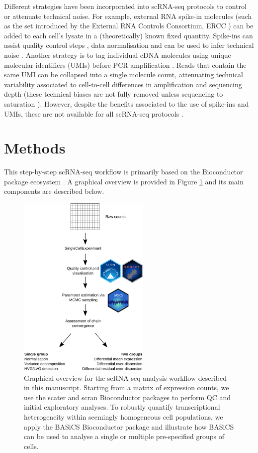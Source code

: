 \documentclass[9pt,a4paper,]{extarticle}
\begin{document}
Different strategies have been incorporated into scRNA-seq protocols to control
or attenuate technical noise.
For example, external RNA spike-in molecules (such as the set introduced by the
External RNA Controls Consortium, ERCC \citep{Rna2005}) can be added to each cell's
lysate in a (theoretically) known fixed quantity.
Spike-ins can assist quality control steps \citep{McCarthy2017}, data normalisation
\citep{Vallejos2017} and can be used to infer technical noise \citep{Brennecke2013}.
Another strategy is to tag individual cDNA molecules using unique molecular
identifiers (UMIs) before PCR amplification \citep{Islam2014}.
Reads that contain the same UMI can be collapsed into a single molecule count,
attenuating technical variability associated to cell-to-cell differences
in amplification and sequencing depth (these technical biases are not fully
removed unless sequencing to saturation \citep{Vallejos2017}).
However, despite the benefits associated to the use of spike-ins and UMIs,
these are not available for all scRNA-seq protocols \citep{Haque2017}.

\hypertarget{methods}{%
\section{Methods}\label{methods}}

This step-by-step scRNA-seq workflow is primarily based on the Bioconductor
package ecosystem \citep{Amezquita2019}.
A graphical overview is provided in Figure \ref{fig:overview}
and its main components are described below.

\begin{figure}

{\centering \includegraphics[width=2.5in,height=3.5in]{figure/Overview} 

}

\caption{Graphical overview for the scRNA-seq analysis workflow described in this manuscript. Starting from a matrix of expression counts, we use the scater and scran Bioconductor packages to perform QC and initial exploratory analyses. To robustly quantify transcriptional heterogeneity within seemingly homogeneous cell populations, we apply the BASiCS Bioconductor package and  illustrate how BASiCS can be used to analyse a single or multiple pre-specified groups of cells.}\label{fig:overview}
\end{figure}
\end{document}
